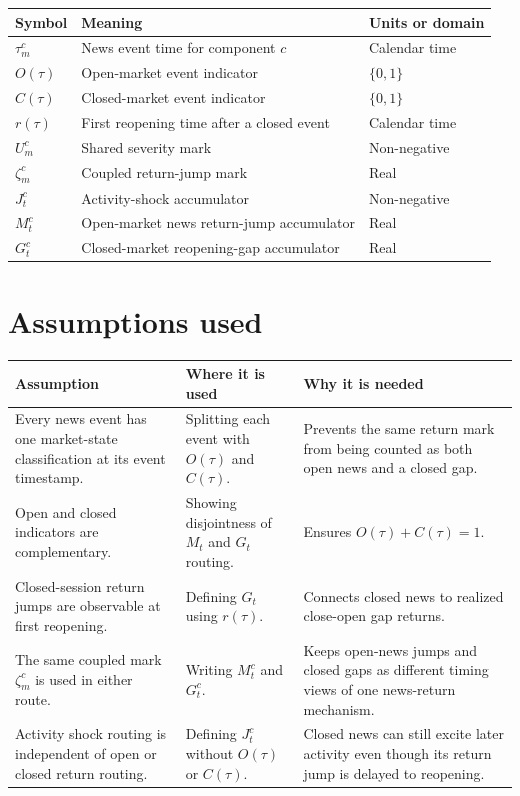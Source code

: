 \documentclass[11pt]{article}
\begin{document}
\begin{tabularx}{\textwidth}{lXX}
\toprule
Symbol & Meaning & Units or domain\\
\midrule
\(\tau_m^c\) & News event time for component \(c\) & Calendar time\\
\(O(\tau)\) & Open-market event indicator & \(\{0,1\}\)\\
\(C(\tau)\) & Closed-market event indicator & \(\{0,1\}\)\\
\(r(\tau)\) & First reopening time after a closed event & Calendar time\\
\(U_m^c\) & Shared severity mark & Non-negative\\
\(\zeta_m^c\) & Coupled return-jump mark & Real\\
\(J_t^c\) & Activity-shock accumulator & Non-negative\\
\(M_t^c\) & Open-market news return-jump accumulator & Real\\
\(G_t^c\) & Closed-market reopening-gap accumulator & Real\\
\bottomrule
\end{tabularx}

\section{Assumptions used}

\begin{tabularx}{\textwidth}{XXX}
\toprule
Assumption & Where it is used & Why it is needed\\
\midrule
Every news event has one market-state classification at its event timestamp.
& Splitting each event with \(O(\tau)\) and \(C(\tau)\).
& Prevents the same return mark from being counted as both open news and a closed gap.\\
Open and closed indicators are complementary.
& Showing disjointness of \(M_t\) and \(G_t\) routing.
& Ensures \(O(\tau)+C(\tau)=1\).\\
Closed-session return jumps are observable at first reopening.
& Defining \(G_t\) using \(r(\tau)\).
& Connects closed news to realized close-open gap returns.\\
The same coupled mark \(\zeta_m^c\) is used in either route.
& Writing \(M_t^c\) and \(G_t^c\).
& Keeps open-news jumps and closed gaps as different timing views of one news-return mechanism.\\
Activity shock routing is independent of open or closed return routing.
& Defining \(J_t^c\) without \(O(\tau)\) or \(C(\tau)\).
& Closed news can still excite later activity even though its return jump is delayed to reopening.\\
\bottomrule
\end{tabularx}
\end{document}
